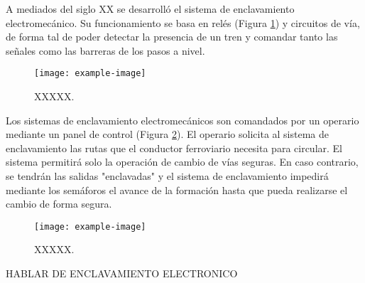     
    A mediados del siglo XX se desarrolló el sistema de enclavamiento electromecánico. Su funcionamiento se basa en relés (Figura \ref{fig:enclavamiento_3}) y circuitos de vía, de forma tal de poder detectar la presencia de un tren y comandar tanto las señales como las barreras de los pasos a nivel.
        
        \begin{figure}[h]
            \centering
            \texttt{[image: example-image]}
            \centering\caption{XXXXX.}
            \label{fig:enclavamiento_3}
        \end{figure} 
    
    Los sistemas de enclavamiento electromecánicos son comandados por un operario mediante un panel de control (Figura \ref{fig:enclavamiento_4}). El operario solicita al sistema de enclavamiento las rutas que el conductor ferroviario necesita para circular. El sistema permitirá solo la operación de cambio de vías seguras. En caso contrario, se tendrán las salidas "enclavadas" y el sistema de enclavamiento impedirá mediante los semáforos el avance de la formación hasta que pueda realizarse el cambio de forma segura.
    
        \begin{figure}[h]
            \centering
            \texttt{[image: example-image]}
            \centering\caption{XXXXX.}
            \label{fig:enclavamiento_4}
        \end{figure}
    
    HABLAR DE ENCLAVAMIENTO ELECTRONICO